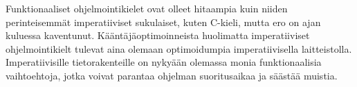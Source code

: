 Funktionaaliset ohjelmointikielet ovat olleet hitaampia kuin niiden perinteisemmät imperatiiviset sukulaiset, kuten
C-kieli, mutta ero on ajan kuluessa kaventunut. Kääntäjäoptimoinneista huolimatta imperatiiviset ohjelmointikielt
tulevat aina olemaan optimoidumpia imperatiivisella laitteistolla. Imperatiivisille tietorakenteille on nykyään olemassa
monia funktionaalisia vaihtoehtoja, jotka voivat parantaa ohjelman suoritusaikaa ja säästää muistia.
\cite{functionaldatastructures}
